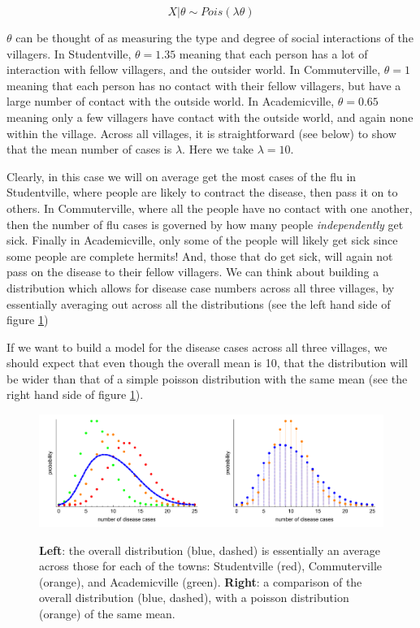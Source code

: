 \documentclass[11pt,fullpage]{book}
\begin{document}
\begin{equation}
X|\theta \sim Pois(\lambda\theta)
\end{equation}

$\theta$ can be thought of as measuring the type and degree of social interactions of the villagers. In Studentville, $\theta=1.35$ meaning that each person has a lot of interaction with fellow villagers, and the outsider world. In Commuterville, $\theta=1$ meaning that each person has no contact with their fellow villagers, but have a large number of contact with the outside world. In Academicville, $\theta=0.65$ meaning only a few villagers have contact with the outside world, and again none within the village. Across all villages, it is straightforward (see below) to show that the mean number of cases is $\lambda$. Here we take $\lambda=10$.

Clearly, in this case we will on average get the most cases of the flu in Studentville, where people are likely to contract the disease, then pass it on to others. In Commuterville, where all the people have no contact with one another, then the number of flu cases is governed by how many people \textit{independently} get sick. Finally in Academicville, only some of the people will likely get sick since some people are complete hermits! And, those that do get sick, will again not pass on the disease to their fellow villagers. We can think about building a distribution which allows for disease case numbers across all three villages, by essentially averaging out across all the distributions (see the left hand side of figure \ref{fig:Distributions_negativeBinomialDispersion})

If we want to build a model for the disease cases across all three villages, we should expect that even though the overall mean is 10, that the distribution will be wider than that of a simple poisson distribution with the same mean (see the right hand side of figure \ref{fig:Distributions_negativeBinomialDispersion}).

\begin{figure}
\centering
\scalebox{0.5} 
{\includegraphics{Distributions_negativeBinomialDispersion.pdf}}
\caption{\textbf{Left}: the overall distribution (blue, dashed) is essentially an average across those for each of the towns: Studentville (red), Commuterville (orange), and Academicville (green). \textbf{Right}: a comparison of the overall distribution (blue, dashed), with a poisson distribution (orange) of the same mean. }\label{fig:Distributions_negativeBinomialDispersion}
\end{figure}
\end{document}
